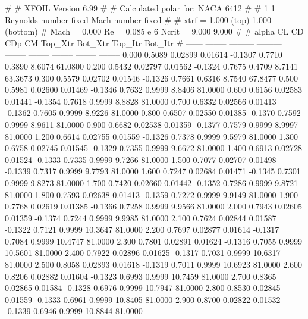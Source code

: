 #  
#       XFOIL         Version 6.99
#  
# Calculated polar for: NACA 6412                                       
#  
# 1 1 Reynolds number fixed          Mach number fixed         
#  
# xtrf =   1.000 (top)        1.000 (bottom)  
# Mach =   0.000     Re =     0.085 e 6     Ncrit =   9.000  9.000
#  
#   alpha    CL        CD       CDp       CM     Top_Xtr  Bot_Xtr  Top_Itr  Bot_Itr
#  ------ -------- --------- --------- -------- -------- -------- -------- --------
   0.000   0.5089   0.02899   0.01614  -0.1307   0.7710   0.3890   8.6074  61.0800
   0.200   0.5432   0.02797   0.01562  -0.1324   0.7675   0.4709   8.7141  63.3673
   0.300   0.5579   0.02702   0.01546  -0.1326   0.7661   0.6316   8.7540  67.8477
   0.500   0.5981   0.02600   0.01469  -0.1346   0.7632   0.9999   8.8406  81.0000
   0.600   0.6156   0.02583   0.01441  -0.1354   0.7618   0.9999   8.8828  81.0000
   0.700   0.6332   0.02566   0.01413  -0.1362   0.7605   0.9999   8.9226  81.0000
   0.800   0.6507   0.02550   0.01385  -0.1370   0.7592   0.9999   8.9611  81.0000
   0.900   0.6682   0.02538   0.01359  -0.1377   0.7579   0.9999   8.9997  81.0000
   1.200   0.6614   0.02755   0.01559  -0.1326   0.7378   0.9999   9.5979  81.0000
   1.300   0.6758   0.02745   0.01545  -0.1329   0.7355   0.9999   9.6672  81.0000
   1.400   0.6913   0.02728   0.01524  -0.1333   0.7335   0.9999   9.7266  81.0000
   1.500   0.7077   0.02707   0.01498  -0.1339   0.7317   0.9999   9.7793  81.0000
   1.600   0.7247   0.02684   0.01471  -0.1345   0.7301   0.9999   9.8273  81.0000
   1.700   0.7420   0.02660   0.01442  -0.1352   0.7286   0.9999   9.8721  81.0000
   1.800   0.7593   0.02638   0.01413  -0.1359   0.7272   0.9999   9.9149  81.0000
   1.900   0.7768   0.02619   0.01385  -0.1366   0.7258   0.9999   9.9566  81.0000
   2.000   0.7943   0.02605   0.01359  -0.1374   0.7244   0.9999   9.9985  81.0000
   2.100   0.7624   0.02844   0.01587  -0.1322   0.7121   0.9999  10.3647  81.0000
   2.200   0.7697   0.02877   0.01614  -0.1317   0.7084   0.9999  10.4747  81.0000
   2.300   0.7801   0.02891   0.01624  -0.1316   0.7055   0.9999  10.5601  81.0000
   2.400   0.7922   0.02896   0.01625  -0.1317   0.7031   0.9999  10.6317  81.0000
   2.500   0.8058   0.02893   0.01618  -0.1319   0.7011   0.9999  10.6923  81.0000
   2.600   0.8206   0.02882   0.01604  -0.1323   0.6993   0.9999  10.7459  81.0000
   2.700   0.8365   0.02865   0.01584  -0.1328   0.6976   0.9999  10.7947  81.0000
   2.800   0.8530   0.02845   0.01559  -0.1333   0.6961   0.9999  10.8405  81.0000
   2.900   0.8700   0.02822   0.01532  -0.1339   0.6946   0.9999  10.8844  81.0000
